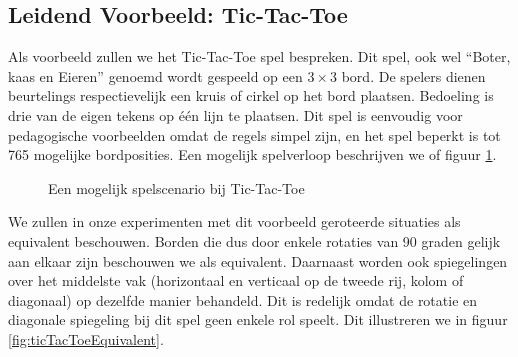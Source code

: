 \subsection{Leidend Voorbeeld: Tic-Tac-Toe}
\begin{leftbar}
Als voorbeeld zullen we het Tic-Tac-Toe spel bespreken. Dit spel, ook wel ``Boter, kaas en Eieren'' genoemd wordt gespeeld op een $3\times3$ bord. De spelers dienen beurtelings respectievelijk een kruis of cirkel op het bord plaatsen. Bedoeling is drie van de eigen tekens op \'e\'en lijn te plaatsen. Dit spel is eenvoudig voor pedagogische voorbeelden omdat de regels simpel zijn, en het spel beperkt is tot 765 mogelijke bordposities. Een mogelijk spelverloop beschrijven we of figuur \ref{fig:ticTacToeExample}.
\end{leftbar}
\begin{figure}[htb]
\centering
{}
\caption{Een mogelijk spelscenario bij Tic-Tac-Toe}
\label{fig:ticTacToeExample}
\end{figure}
\begin{leftbar}
We zullen in onze experimenten met dit voorbeeld geroteerde situaties als equivalent beschouwen. Borden die dus door enkele rotaties van 90 graden gelijk aan elkaar zijn beschouwen we als equivalent. Daarnaast worden ook spiegelingen over het middelste vak (horizontaal en verticaal op de tweede rij, kolom of diagonaal) op dezelfde manier behandeld. Dit is redelijk omdat de rotatie en diagonale spiegeling bij dit spel geen enkele rol speelt. Dit illustreren we in figuur \ref{fig:ticTacToeEquivalent}.
\end{leftbar}
